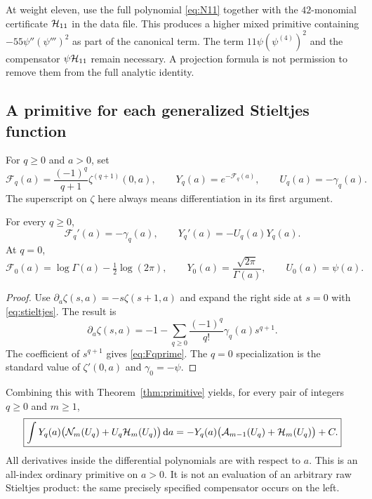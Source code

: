 At weight eleven, use the full polynomial \eqref{eq:N11} together with the $42$-monomial certificate $\mathcal H_{11}$ in the data file. This produces a higher mixed primitive containing $-55\psi''(\psi''')^2$ as part of the canonical term. The term $11\psi(\psi^{(4)})^2$ and the compensator $\psi\mathcal H_{11}$ remain necessary. A projection formula is not permission to remove them from the full analytic identity.

\subsection{A primitive for each generalized Stieltjes function}

For $q\ge0$ and $a>0$, set
\begin{equation}\label{eq:Fq}
 \mathcal F_q(a)=\frac{(-1)^q}{q+1}\zeta^{(q+1)}(0,a),
 \qquad Y_q(a)=e^{-\mathcal F_q(a)},
 \qquad U_q(a)=-\gamma_q(a).
\end{equation}
The superscript on $\zeta$ here always means differentiation in its first argument.

\begin{lemma}\label{lem:Fq}
For every $q\ge0$,
\begin{equation}\label{eq:Fqprime}
 \mathcal F_q'(a)=-\gamma_q(a),\qquad
 Y_q'(a)=-U_q(a)Y_q(a).
\end{equation}
At $q=0$,
\[
 \mathcal F_0(a)=\log\Gamma(a)-\tfrac12\log(2\pi),
 \qquad Y_0(a)=\frac{\sqrt{2\pi}}{\Gamma(a)},\qquad U_0(a)=\psi(a).
\]
\end{lemma}
\begin{proof}
Use $\partial_a\zeta(s,a)=-s\zeta(s+1,a)$ and expand the right side at $s=0$ with \eqref{eq:stieltjes}. The result is
\[
 \partial_a\zeta(s,a)=-1-
       \sum_{q\ge0}\frac{(-1)^q}{q!}\gamma_q(a)s^{q+1}.
\]
The coefficient of $s^{q+1}$ gives \eqref{eq:Fqprime}. The $q=0$ specialization is the standard value of $\zeta'(0,a)$ and $\gamma_0=-\psi$.
\end{proof}

Combining this with Theorem~\ref{thm:primitive} yields, for every pair of integers $q\ge0$ and $m\ge1$,
\begin{equation}\label{eq:stieltjes-weighted}
 \boxed{\displaystyle
 \int Y_q(a)\bigl(\mathcal N_m(U_q)+U_q\mathcal H_m(U_q)\bigr)\,\mathrm d a
 =-Y_q(a)\bigl(\mathcal A_{m-1}(U_q)+\mathcal H_m(U_q)\bigr)+C.}
\end{equation}
All derivatives inside the differential polynomials are with respect to $a$. This is an all-index ordinary primitive on $a>0$. It is not an evaluation of an arbitrary raw Stieltjes product: the same precisely specified compensator occurs on the left.

